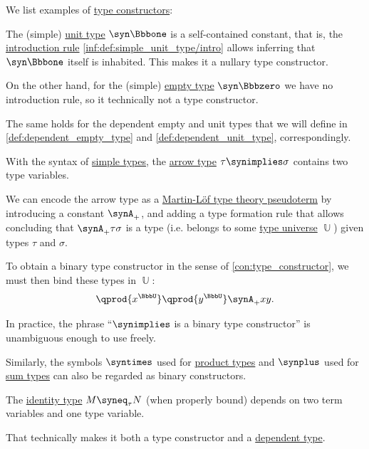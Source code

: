 \begin{example}\label{ex:con:type_constructor}
  We list examples of \hyperref[con:type_constructor]{type constructors}:
  \begin{thmenum}
     The (simple) \hyperref[def:simple_unit_type]{unit type} \( \syn\Bbbone \) is a self-contained constant, that is, the \hyperref[rem:type_theory_rule_classification/intro]{introduction rule} \ref{inf:def:simple_unit_type/intro} allows inferring that \( \syn\Bbbone \) itself is inhabited. This makes it a nullary type constructor.

    On the other hand, for the (simple) \hyperref[def:simple_empty_type]{empty type} \( \syn\Bbbzero \) we have no introduction rule, so it technically not a type constructor.

    The same holds for the dependent empty and unit types that we will define in \cref{def:dependent_empty_type} and \cref{def:dependent_unit_type}, correspondingly.

     With the syntax of \hyperref[def:simple_type]{simple types}, the \hyperref[def:arrow_type]{arrow type} \( \tau \synimplies \sigma \) contains two type variables.

    We can encode the arrow type as a \hyperref[rem:pseudoterm_schemas]{Martin-L\"of type theory pseudoterm} by introducing a constant \( \synA_+ \), and adding a type formation rule that allows concluding that \( \synA_+ \tau \sigma \) is a type (i.e. belongs to some \hyperref[con:type_universe]{type universe} \( \BbbU \)) given types \( \tau \) and \( \sigma \).

    To obtain a binary type constructor in the sense of \cref{con:type_constructor}, we must then bind these types in \( \BbbU \):
    \begin{equation*}
      \qprod {x^\BbbU} \qprod {y^\BbbU} \synA_+ x y.
    \end{equation*}

    In practice, the phrase \enquote{\( {\synimplies} \) is a binary type constructor} is unambiguous enough to use freely.

    Similarly, the symbols \( {\syntimes} \) used for \hyperref[def:simple_product_type]{product types} and \( {\synplus} \) used for \hyperref[def:simple_sum_type]{sum types} can also be regarded as binary constructors.

     The \hyperref[def:identity_type]{identity type} \( M \syneq_\tau N \) (when properly bound) depends on two term variables and one type variable.

    That technically makes it both a type constructor and a \hyperref[con:dependent_type]{dependent type}.
  \end{thmenum}
\end{example}

